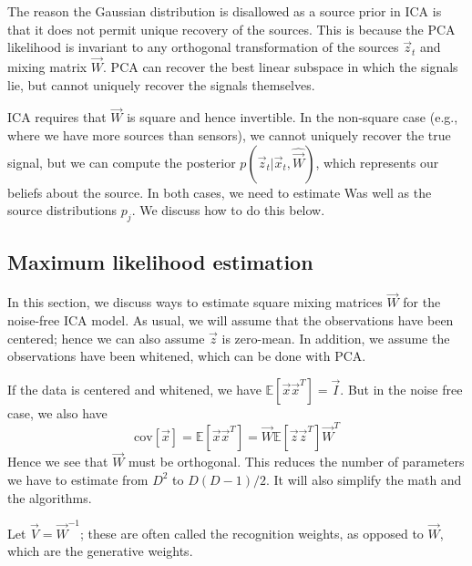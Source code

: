 The reason the Gaussian distribution is disallowed as a source prior in ICA is that it does not permit unique recovery of the sources. This is because the PCA likelihood is invariant to any orthogonal transformation of the sources $\vec{z}_t$ and mixing matrix $\vec{W}$. PCA can recover the best linear subspace in which the signals lie, but cannot uniquely recover the signals themselves.

ICA requires that $\vec{W}$ is square and hence invertible. In the non-square case (e.g., where we have more sources than sensors), we cannot uniquely recover the true signal, but we can compute the posterior $p(\vec{z}_t|\vec{x}_t,\hat{\vec{W}})$, which represents our beliefs about the source. In both cases, we need to estimate Was well as the source distributions $p_j$. We discuss how to do this below.


\subsection{Maximum likelihood estimation}
In this section, we discuss ways to estimate square mixing matrices $\vec{W}$ for the noise-free ICA model. As usual, we will assume that the observations have been centered; hence we can also assume $\vec{z}$ is zero-mean. In addition, we assume the observations have been whitened, which can be done with PCA. 

If the data is centered and whitened, we have $\mathbb{E}[\vec{x}\vec{x}^T]=\vec{I}$. But in the noise free case, we also have
\begin{equation}
\mathrm{cov}[\vec{x}]=\mathbb{E}[\vec{x}\vec{x}^T]=\vec{W}\mathbb{E}[\vec{z}\vec{z}^T]\vec{W}^T
\end{equation}
Hence we see that $\vec{W}$ must be orthogonal. This reduces the number of parameters we have to estimate from $D^2$ to $D(D-1)/2$. It will also simplify the math and the algorithms.

Let $\vec{V}=\vec{W}^{-1}$; these are often called the recognition weights, as opposed to $\vec{W}$, which are the generative weights.

